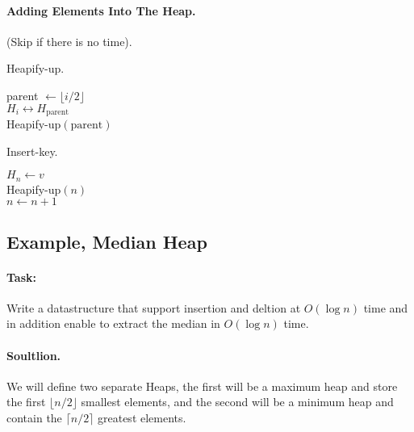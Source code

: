 \paragraph{Adding Elements Into The Heap.} (Skip if there is no time).

\begin{algbox}{Heapify-up.}
\begin{algorithm}[H]
parent $\leftarrow \lfloor i/2 \rfloor $ \\
 { 
  $ H_{i} \leftrightarrow H_{\text{parent}} $ \\ 
  Heapify-up$\left( \text{parent}  \right)$
}
\end{algorithm}
\end{algbox}



\begin{algbox}{Insert-key.}
\begin{algorithm}[H]
$ H_{n} \leftarrow v $ \\ 
Heapify-up$\left( n \right)$\\
$ n \leftarrow n + 1 $ 
\end{algorithm}
\end{algbox}



\newpage 
\subsection*{Example, Median Heap}

\paragraph{Task:}Write a datastructure that support insertion and deltion at $O\left( \log n \right) $ time and in addition enable to extract the median in $O\left( \log n  \right)$ time. 

\paragraph{Soultlion.} We will define two separate Heaps, the first will be a maximum heap and store the first $ \lfloor n/2 \rfloor $ smallest elements, and the second will be a minimum heap and contain the $ \lceil n/2 \rceil$ greatest elements. 

